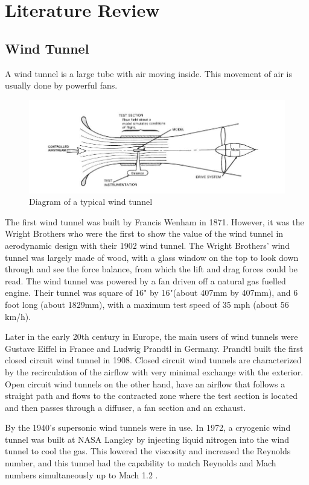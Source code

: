 \section{Literature Review}
\subsection{Wind Tunnel}
A wind tunnel is a large tube with air moving inside. This movement of air is usually done by powerful fans.
\begin{center}
	\begin{figure}[H]
		\centering
		\includegraphics[width=0.7\linewidth]{Figures/Fig2}
		\caption[A Typical Wind Tunnel]{Diagram of a typical wind tunnel \cite{morris_force_2010}}
	\end{figure}
\end{center}
The first wind tunnel was built by Francis Wenham in 1871. However, it was the Wright Brothers who were the first to show the value of the wind tunnel in aerodynamic design with their 1902 wind tunnel. The Wright Brothers’ wind tunnel was largely made of wood, with a glass window on the top to look down through and see the force balance, from which the
lift and drag forces could be read. The wind tunnel was powered by a fan driven off a natural gas fuelled engine. Their tunnel was square of 16" by 16"(about 407mm by 407mm), and 6 foot long (about 1829mm), with a maximum test speed of 35 mph (about 56 km/h)\cite{morris_force_2010}.


Later in the early 20th century in Europe, the main users of wind tunnels were Gustave Eiffel in France and Ludwig Prandtl in Germany. Prandtl built the first closed circuit wind tunnel in 1908. Closed circuit wind tunnels are characterized by the recirculation of the airflow with very minimal exchange with the exterior. Open circuit wind tunnels on the other hand, have an airflow that follows a straight path and flows to the contracted zone where the test section is located and then passes through a diffuser, a fan section and an exhaust.

By the 1940’s supersonic wind tunnels were in use. In 1972, a cryogenic wind tunnel was built at NASA Langley by injecting liquid nitrogen into the wind tunnel to cool the gas. This lowered the viscosity and increased the Reynolds number, and this tunnel had the capability to match Reynolds and Mach numbers simultaneously up to Mach 1.2
\cite{fernandes_design_nodate}.

